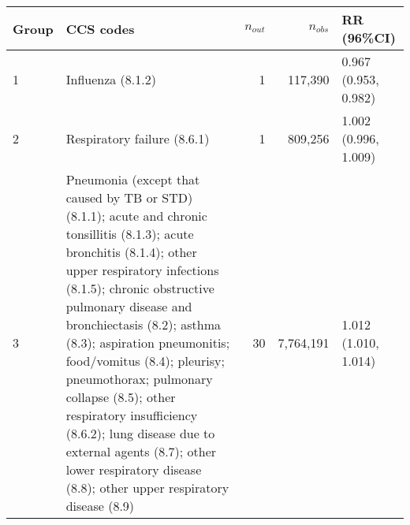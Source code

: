 \begin{tabular}{lp{6.5cm}rrp{2.2cm}}
  \hline
Group & CCS codes & $n_{out}$ & $n_{obs}$ & RR (96\%CI) \\ 
  \hline
   1 & Influenza (8.1.2) &    1 & 117,390 & 0.967 (0.953, 0.982) \\ 
     2 & Respiratory failure (8.6.1) &    1 & 809,256 & 1.002 (0.996, 1.009) \\ 
     3 & Pneumonia (except that caused by TB or STD) (8.1.1); acute and chronic tonsillitis (8.1.3); acute bronchitis (8.1.4); other upper respiratory infections (8.1.5); chronic obstructive pulmonary disease and bronchiectasis (8.2); asthma (8.3); aspiration pneumonitis; food/vomitus (8.4); pleurisy; pneumothorax; pulmonary collapse (8.5); other respiratory insufficiency (8.6.2); lung disease due to external agents (8.7); other lower respiratory disease (8.8); other upper respiratory disease (8.9) &   30 & 7,764,191 & 1.012 (1.010, 1.014) \\ 
   \hline
\end{tabular}

